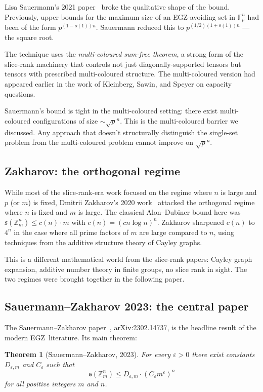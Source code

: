 \documentclass[11pt,a4paper]{article}
\theoremstyle{plain}
\newtheorem{theorem}{Theorem}[section]
\theoremstyle{definition}
\theoremstyle{remark}
\newcommand{\F}{\mathbb{F}}
\newcommand{\Z}{\mathbb{Z}}
\newcommand{\sUFp}{\mathfrak{s}}
\newcommand{\EGZ}{\textsf{EGZ}}
\begin{document}
Lisa Sauermann's 2021 paper~\cite{sauermann2021} broke the qualitative shape of the bound. Previously, upper bounds for the maximum size of an \EGZ-avoiding set in $\F_p^n$ had been of the form $p^{(1-o(1))n}$. Sauermann reduced this to $p^{(1/2)(1+o(1))n}$ --- the square root.

The technique uses the \emph{multi-coloured sum-free theorem}, a strong form of the slice-rank machinery that controls not just diagonally-supported tensors but tensors with prescribed multi-coloured structure. The multi-coloured version had appeared earlier in the work of Kleinberg, Sawin, and Speyer on capacity questions.

Sauermann's bound is tight in the multi-coloured setting: there exist multi-coloured configurations of size $\sim \sqrt{p}^n$. This is the multi-coloured barrier we discussed. Any approach that doesn't structurally distinguish the single-set problem from the multi-coloured problem cannot improve on $\sqrt{p}^n$.

\subsection{Zakharov: the orthogonal regime}

While most of the slice-rank-era work focused on the regime where $n$ is large and $p$ (or $m$) is fixed, Dmitrii Zakharov's 2020 work~\cite{zakharov2020} attacked the orthogonal regime where $n$ is fixed and $m$ is large. The classical Alon--Dubiner bound here was $\sUFp(\Z_m^n) \leq c(n) \cdot m$ with $c(n) = (cn \log n)^n$. Zakharov sharpened $c(n)$ to $4^n$ in the case where all prime factors of $m$ are large compared to $n$, using techniques from the additive structure theory of Cayley graphs.

This is a different mathematical world from the slice-rank papers: Cayley graph expansion, additive number theory in finite groups, no slice rank in sight. The two regimes were brought together in the following paper.

\subsection{Sauermann--Zakharov 2023: the central paper}\label{sec:sauermann-zakharov}

The Sauermann--Zakharov paper~\cite{sauermannzakharov2023}, arXiv:2302.14737, is the headline result of the modern \EGZ\ literature. Its main theorem:

\begin{theorem}[Sauermann--Zakharov, 2023]
For every $\varepsilon > 0$ there exist constants $D_{\varepsilon, m}$ and $C_\varepsilon$ such that
\[
\sUFp(\Z_m^n) \leq D_{\varepsilon, m} \cdot (C_\varepsilon m^\varepsilon)^n
\]
for all positive integers $m$ and $n$.
\end{theorem}
\end{document}

